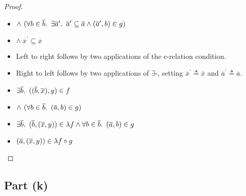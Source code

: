 \begin{prop}
\begin{proof}
\begin{itemize}
    \addtolength{\itemsep}{-.3\baselineskip}
    \item[\phantom{\imps}]
      \quad$\land~(\forall b\in\overline{b}\ldotp~\exists\overline{a}^\prime\ldotp~\overline{a}^\prime\subseteq\overline{a}\land(\overline{a}^\prime,b)\in g)$

    \item[\phantom{\imps}]
      \quad$\land~\overline{x}^\prime\subseteq\overline{x}$
    \addtolength{\itemsep}{.3\baselineskip}

    \item[\phantom{\imps}]
      Left to right follows by two applications of the c-relation condition.

    \item[\phantom{\imps}]
      Right to left follows by two applications of $\exists$-\Intro, setting $\overline{x}^\prime\triangleq\overline{x}$ and $\overline{a}^\prime\triangleq\overline{a}$.

    \item[\iffs]
      $\exists\overline{b}\ldotp~((\overline{b},\overline{x}),y)\in f$

    \addtolength{\itemsep}{-.3\baselineskip}
    \item[\phantom{\imps}]
      \quad$\land~(\forall b\in\overline{b}\ldotp~(\overline{a},b)\in g)$
    \addtolength{\itemsep}{.3\baselineskip}

    \item[\iffs]
      $\exists\overline{b}\ldotp~(\overline{b},(\overline{x},y))\in \lambda f\land\forall b\in\overline{b}\ldotp~(\overline{a},b)\in g$
     \marginnote{\Def-$\lambda\cdot$}

    \item[\iffs]
      $(\overline{a},(\overline{x},y))\in\lambda f\circ g$
      \qedhere
    \end{itemize}
  \end{proof}
\end{prop}

\subsection{Part (k)}\label{sec:q-2-k}

